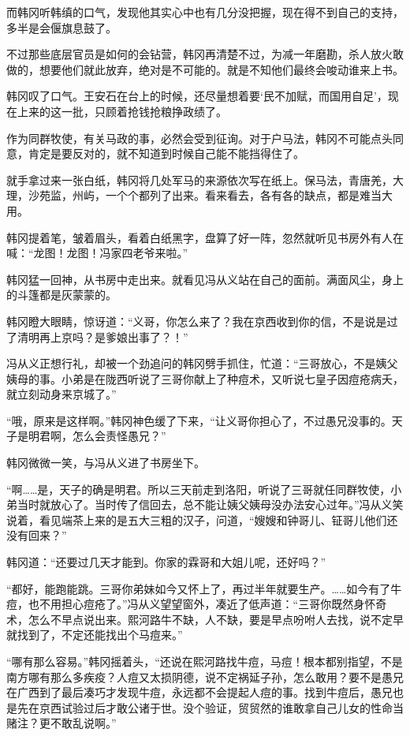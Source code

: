 而韩冈听韩缜的口气，发现他其实心中也有几分没把握，现在得不到自己的支持，多半是会偃旗息鼓了。

不过那些底层官员是如何的会钻营，韩冈再清楚不过，为减一年磨勘，杀人放火敢做的，想要他们就此放弃，绝对是不可能的。就是不知他们最终会唆动谁来上书。

韩冈叹了口气。王安石在台上的时候，还尽量想着要‘民不加赋，而国用自足’，现在上来的这一批，只顾着抢钱抢粮挣政绩了。

作为同群牧使，有关马政的事，必然会受到征询。对于户马法，韩冈不可能点头同意，肯定是要反对的，就不知道到时候自己能不能挡得住了。

就手拿过来一张白纸，韩冈将几处军马的来源依次写在纸上。保马法，青唐羌，大理，沙苑监，州屿，一个个都列了出来。看来看去，各有各的缺点，都是难当大用。

韩冈提着笔，皱着眉头，看着白纸黑字，盘算了好一阵，忽然就听见书房外有人在喊：“龙图！龙图！冯家四老爷来啦。”

韩冈猛一回神，从书房中走出来。就看见冯从义站在自己的面前。满面风尘，身上的斗篷都是灰蒙蒙的。

韩冈瞪大眼睛，惊讶道：“义哥，你怎么来了？我在京西收到你的信，不是说是过了清明再上京吗？是爹娘出事了？！”

冯从义正想行礼，却被一个劲追问的韩冈劈手抓住，忙道：“三哥放心，不是姨父姨母的事。小弟是在陇西听说了三哥你献上了种痘术，又听说七皇子因痘疮病夭，就立刻动身来京城了。”

“哦，原来是这样啊。”韩冈神色缓了下来，“让义哥你担心了，不过愚兄没事的。天子是明君啊，怎么会责怪愚兄？”

韩冈微微一笑，与冯从义进了书房坐下。

“啊……是，天子的确是明君。所以三天前走到洛阳，听说了三哥就任同群牧使，小弟当时就放心了。当时传了信回去，总不能让姨父姨母没办法安心过年。”冯从义笑说着，看见端茶上来的是五大三粗的汉子，问道，“嫂嫂和钟哥儿、钲哥儿他们还没有回来？”

韩冈道：“还要过几天才能到。你家的霖哥和大姐儿呢，还好吗？”

“都好，能跑能跳。三哥你弟妹如今又怀上了，再过半年就要生产。……如今有了牛痘，也不用担心痘疮了。”冯从义望望窗外，凑近了低声道：“三哥你既然身怀奇术，怎么不早点说出来。熙河路牛不缺，人不缺，要是早点吩咐人去找，说不定早就找到了，不定还能找出个马痘来。”

“哪有那么容易。”韩冈摇着头，“还说在熙河路找牛痘，马痘！根本都别指望，不是南方哪有那么多疾疫？人痘又太损阴德，说不定祸延子孙，怎么敢用？要不是愚兄在广西到了最后凑巧才发现牛痘，永远都不会提起人痘的事。找到牛痘后，愚兄也是先在京西试验过后才敢公诸于世。没个验证，贸贸然的谁敢拿自己儿女的性命当赌注？更不敢乱说啊。”

